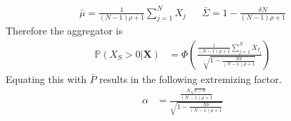 \documentclass[11pt,twoside]{article}
\renewcommand{\P}{\mathbb{P}}
\theoremstyle{definition}
\theoremstyle{definition}
\begin{document}
\begin{align*}
\bar{\mu} = \frac{1}{(N-1)\rho +1}  \sum_{j=1}^N X_j 
&&  \bar{\Sigma} = 1  - \frac{\delta N}{(N-1)\rho +1} 
\end{align*}
Therefore the  aggregator is
\begin{align*}
\P\left(X_S > 0 | \boldsymbol{X}\right) &=\Phi\left(\frac{\frac{1}{(N-1)\rho +1} \sum_{j=1}^N X_{I_j} }{\sqrt{1- \frac{N\delta}{(N-1)\rho +1} }}  \right)
\end{align*}
Equating this with $\bar{P}$ results in the following extremizing factor.
\begin{align}
\alpha &= \frac{\frac{N\sqrt{1-\delta}}{(N-1)\rho +1}}{\sqrt{1- \frac{N\delta}{(N-1)\rho +1} }} \label{CompoundAlpha}
\end{align}
\end{document}

